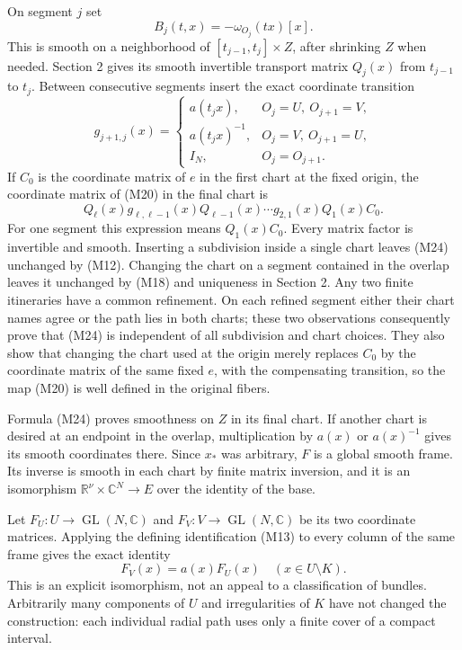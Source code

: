 \documentclass[
  11pt,
]{article}
\begin{document}
On segment \(j\) set \[
B_j(t,x)=-\omega_{O_j}(tx)[x].
\tag{M22}
\] This is smooth on a neighborhood of \([t_{j-1},t_j]\times Z\), after
shrinking \(Z\) when needed. Section 2 gives its smooth invertible
transport matrix \(Q_j(x)\) from \(t_{j-1}\) to \(t_j\). Between
consecutive segments insert the exact coordinate transition \[
g_{j+1,j}(x)=
\begin{cases}
a(t_jx),&O_j=U,\ O_{j+1}=V,\\
a(t_jx)^{-1},&O_j=V,\ O_{j+1}=U,\\
I_N,&O_j=O_{j+1}.
\end{cases}
\tag{M23}
\] If \(C_0\) is the coordinate matrix of \(e\) in the first chart at
the fixed origin, the coordinate matrix of (M20) in the final chart is
\[
Q_\ell(x)g_{\ell,\ell-1}(x)Q_{\ell-1}(x)
\cdots g_{2,1}(x)Q_1(x)C_0.
\tag{M24}
\] For one segment this expression means \(Q_1(x)C_0\). Every matrix
factor is invertible and smooth. Inserting a subdivision inside a single
chart leaves (M24) unchanged by (M12). Changing the chart on a segment
contained in the overlap leaves it unchanged by (M18) and uniqueness in
Section 2. Any two finite itineraries have a common refinement. On each
refined segment either their chart names agree or the path lies in both
charts; these two observations consequently prove that (M24) is
independent of all subdivision and chart choices. They also show that
changing the chart used at the origin merely replaces \(C_0\) by the
coordinate matrix of the same fixed \(e\), with the compensating
transition, so the map (M20) is well defined in the original fibers.

Formula (M24) proves smoothness on \(Z\) in its final chart. If another
chart is desired at an endpoint in the overlap, multiplication by
\(a(x)\) or \(a(x)^{-1}\) gives its smooth coordinates there. Since
\(x_*\) was arbitrary, \(F\) is a global smooth frame. Its inverse is
smooth in each chart by finite matrix inversion, and it is an
isomorphism \(\mathbb R^\nu\times\mathbb C^N\to E\) over the identity of
the base.

Let \(F_U:U\to\operatorname{GL}(N,\mathbb C)\) and
\(F_V:V\to\operatorname{GL}(N,\mathbb C)\) be its two coordinate
matrices. Applying the defining identification (M13) to every column of
the same frame gives the exact identity \[
F_V(x)=a(x)F_U(x)
\quad(x\in U\setminus K).
\tag{M25}
\] This is an explicit isomorphism, not an appeal to a classification of
bundles. Arbitrarily many components of \(U\) and irregularities of
\(K\) have not changed the construction: each individual radial path
uses only a finite cover of a compact interval.
\end{document}
